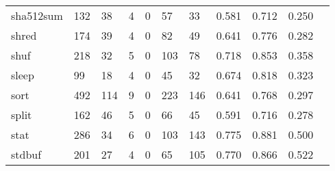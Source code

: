 \begin{longtable}{lp{1.10cm}p{1.10cm}p{1.10cm}p{1.10cm}p{1.10cm}p{1.10cm}p{1.10cm}p{1.10cm}p{1.10cm}p{1.10cm}}
sha512sum &                    132 &                                 38 &                                 4 &                                0 &                                57 &                              33 &                          0.581 &                                 0.712 &                               0.250 \\
shred     &                    174 &                                 39 &                                 4 &                                0 &                                82 &                              49 &                          0.641 &                                 0.776 &                               0.282 \\
shuf      &                    218 &                                 32 &                                 5 &                                0 &                               103 &                              78 &                          0.718 &                                 0.853 &                               0.358 \\
sleep     &                     99 &                                 18 &                                 4 &                                0 &                                45 &                              32 &                          0.674 &                                 0.818 &                               0.323 \\
sort      &                    492 &                                114 &                                 9 &                                0 &                               223 &                             146 &                          0.641 &                                 0.768 &                               0.297 \\
split     &                    162 &                                 46 &                                 5 &                                0 &                                66 &                              45 &                          0.591 &                                 0.716 &                               0.278 \\
stat      &                    286 &                                 34 &                                 6 &                                0 &                               103 &                             143 &                          0.775 &                                 0.881 &                               0.500 \\
stdbuf    &                    201 &                                 27 &                                 4 &                                0 &                                65 &                             105 &                          0.770 &                                 0.866 &                               0.522 \\

\end{longtable}
